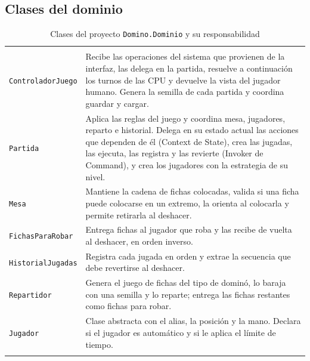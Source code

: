 

\subsection{Clases del dominio}

{\tablacompacta
\begin{longtable}{@{}L{4.4cm}L{10.1cm}@{}}
  \caption{Clases del proyecto \texttt{Domino.Dominio} y su responsabilidad}\label{tab:clases}\\
  \toprule
   &  \\ \midrule \endfirsthead
  \toprule
   &  \\ \midrule \endhead
  \bottomrule \endlastfoot
  \texttt{ControladorJuego} & Recibe las operaciones del sistema que provienen de la interfaz, las delega en la partida, resuelve a continuación los turnos de las CPU y devuelve la vista del jugador humano. Genera la semilla de cada partida y coordina guardar y cargar. \\ \filasep
  \texttt{Partida} & Aplica las reglas del juego y coordina mesa, jugadores, reparto e historial. Delega en su estado actual las acciones que dependen de él (Context de State), crea las jugadas, las ejecuta, las registra y las revierte (Invoker de Command), y crea los jugadores con la estrategia de su nivel. \\ \filasep
  \texttt{Mesa} & Mantiene la cadena de fichas colocadas, valida si una ficha puede colocarse en un extremo, la orienta al colocarla y permite retirarla al deshacer. \\ \filasep
  \texttt{FichasParaRobar} & Entrega fichas al jugador que roba y las recibe de vuelta al deshacer, en orden inverso. \\ \filasep
  \texttt{HistorialJugadas} & Registra cada jugada en orden y extrae la secuencia que debe revertirse al deshacer. \\ \filasep
  \texttt{Repartidor} & Genera el juego de fichas del tipo de dominó, lo baraja con una semilla y lo reparte; entrega las fichas restantes como fichas para robar. \\ \filasep
  \texttt{Jugador} & Clase abstracta con el alias, la posición y la mano. Declara si el jugador es automático y si le aplica el límite de tiempo. \\ \filasep

\end{longtable}}
